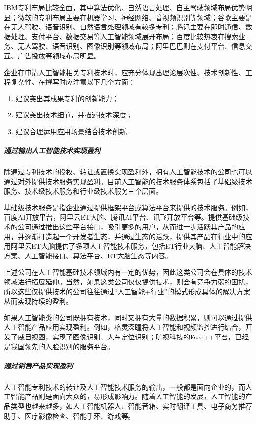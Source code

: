 \documentclass[letterpaper,11pt,english]{sphinxmanual}
\begin{document}
IBM专利布局比较全面，其中算法优化、自然语言处理、自主驾驶领域布局优势明显；微软的专利布局主要在机器学习、神经网络、音视频识别等领域；谷歌主要是在无人驾驶、语音识别、自然语言处理领域有较多专利；腾讯主要在即时通信、数据处理、支付平台、数据交易等人工智能领域展开布局；百度比较热衷在搜索业务、无人驾驶、语音识别、图像识别等领域布局；阿里巴巴则在支付平台、信息交互、广告投放等领域布局明显。

企业在申请人工智能相关专利技术时，应充分体现出理论层次性、技术创新性、工程复杂性。在撰写时应注意以下几个方面：
\begin{enumerate}
%
\item {} 
建议突出其成果专利的创新能力；

\item {} 
建议突出技术细节，并描述技术深度；

\item {} 
建议合理运用应用场景结合技术创新。

\end{enumerate}


\subparagraph{通过输出人工智能技术实现盈利}
\label{\detokenize{chapter_introduction/money:id17}}
除通过专利技术的授权、转让或置换实现盈利外，拥有人工智能技术的公司也可以通过对外提供技术服务实现盈利。目前人工智能的技术服务体系包括了基础级技术服务、技术级技术服务和行业级技术服务三个层面。

基础级技术服务是指企业通过提供框架平台或算法平台来提供的技术服务。例如，百度AI开放平台，阿里云ET大脑、腾讯AI平台、讯飞开放平台等。提供基础级技术的公司通过推出这些平台接口，吸引更多的用户，从而进一步活跃其产品的应用，并逐渐打造起一个开发者生态，并通过生态的活跃，提供其产品在行业中的应用阿里云ET大脑提供了多项人工智能技术服务，包括ET行业大脑、人工智能解决方案、人工智能接口、算法平台、ET大脑生态等内容。

上述公司在人工智能基础技术领域内有一定的优势，因此这类公司会在具体的技术领域进行拓展延伸。当然，如果这类公司仅仅提供技术，则会有竞争力弱的困扰，所以这些仅提供技术的公司往往通过“人工智能+行业”的模式形成具体的解决方案从而实现持续的盈利。

如果人工智能类的公司既拥有技术，同时又拥有大量的数据积累，则可以通过提供人工智能产品应用实现盈利。例如，格灵深瞳将人工智能和视频监控进行结合，开发了威目视图，实现了图像识别、人车定位识别；旷视科技的Face++平台，已经是我国领先的人脸识别的服务平台。


\subparagraph{通过销售产品实现盈利}
\label{\detokenize{chapter_introduction/money:id18}}
人工智能专利技术的转让及人工智能技术服务的输出，一般都是面向企业的，而人工智能产品则是面向大众的，易形成影响力。随着人工智能的发展，人工智能的产品类型也越来越多，如人工智能机器人、智能音箱、实时翻译工具、电子商务推荐助手、医疗影像检查、智能手环、游戏等。
\end{document}
